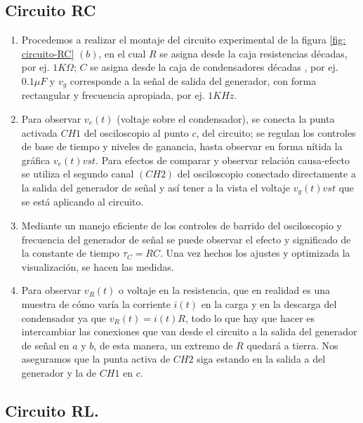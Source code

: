 \documentclass[]{article}
\begin{document}
\subsection*{\textbf{Circuito RC}}
\begin{enumerate}
      \item Procedemos a realizar el montaje del circuito experimental de la figura \ref{fig: circuito-RC} $(b)$, en el cual
      $R$ se asigna desde la caja resistencias décadas, por ej. $1 K\Omega$; $C$ se asigna desde la caja de condensadores décadas
      , por ej. $0.1 \mu F$ y $v_g$ corresponde a la señal de salida del generador, con forma rectangular y frecuencia apropiada, por
      ej. $1 K Hz$.

      \item Para observar $v_e(t)$ (voltaje sobre el condensador), se conecta la punta activada $CH1$ del osciloscopio al punto $c$, del circuito; se regulan los controles de base 
      de tiempo y niveles de ganancia, hasta observar en forma nítida la gráfica $v_e(t) vs t$. Para efectos de comparar y observar relación causa-efecto se utiliza el segundo canal 
      $(CH2)$ del osciloscopio conectado directamente a la salida del generador de señal y así tener a la vista el voltaje $v_g (t) vs t$ que se está aplicando al circuito.

      \item Mediante un manejo eficiente de los controles de barrido del osciloscopio y frecuencia del generador de señal se puede observar el efecto y significado de la constante de tiempo $\tau_C = RC$. Una vez hechos 
      los ajustes y optimizada la visualización, se hacen las medidas. 

      \item Para observar $v_R(t)$ o voltaje en la resistencia, que en realidad es una muestra de cómo varía la corriente $i(t)$ en la carga y en la descarga del condensador ya que $v_R(t) = i(t) R$, todo lo que hay que hacer
       es intercambiar las conexiones que van desde el circuito a la salida del generador de señal en $a$ y $b$, de esta manera, un extremo de $R$ quedará a tierra. Nos aseguramos que la punta activa de $CH2$ siga estando en la 
       salida a del generador y la de $CH1$ en $c$.
\end{enumerate}

\subsection*{\textbf{Circuito RL.}}
\end{document}
